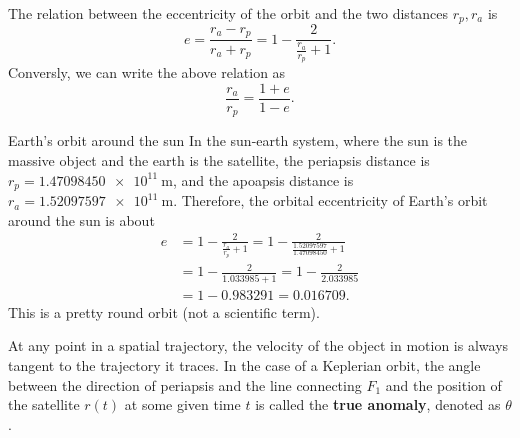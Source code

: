 The relation between the eccentricity of the orbit and the two distances $r_{p},r_{a}$ is
\begin{equation}
	e = \frac{r_{a}-r_{p}}{r_{a}+r_{p}} = 1-\frac{2}{\frac{r_{a}}{r_{p}}+1}.
	\label{eq:eccentricity_relation_to_apsis_1}
\end{equation}
Conversly, we can write the above relation as
\begin{equation}
	\frac{r_{a}}{r_{p}} = \frac{1+e}{1-e}.
	\label{eq:eccentricity_relation_to_apsis_2}
\end{equation}

\begin{example}{Earth's orbit around the sun}{}
	In the sun-earth system, where the sun is the massive object and the earth is the satellite, the periapsis distance is $r_{p}=\SI{1.47098450e+11}{\meter}$, and the apoapsis distance is $r_{a}=\SI{1.52097597e+11}{\meter}$. Therefore, the orbital eccentricity of Earth's orbit around the sun is about
	\begin{align*}
		e & = 1-\frac{2}{\frac{r_{a}}{r_{p}}+1} = 1-\frac{2}{\frac{1.52097597}{1.47098450}+1} \\
		  & = 1-\frac{2}{1.033985+1} = 1-\frac{2}{2.033985}                                   \\
		  & = 1-0.983291 = 0.016709.
	\end{align*}
	This is a pretty round orbit (not a scientific term).
\end{example}

At any point in a spatial trajectory, the velocity of the object in motion is always tangent to the trajectory it traces.  In the case of a Keplerian orbit, the angle between the direction of periapsis and the line connecting $F_{1}$ and the position of the satellite $r(t)$ at some given time $t$ is called the \textbf{true anomaly}, denoted as $\theta$.

